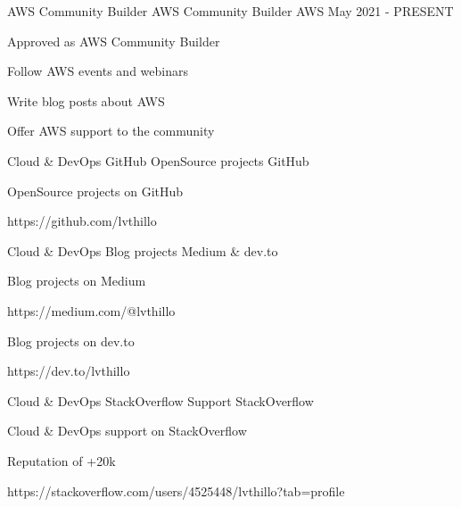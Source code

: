 

\begin{cventries}

  \cventry
    {AWS Community Builder} %
    {AWS Community Builder} %
    {AWS} %
    {May 2021 - PRESENT} %
    {
      \begin{cvitems} %
        \item {Approved as AWS Community Builder}
        \item {Follow AWS events and webinars}
        \item {Write blog posts about AWS}
        \item {Offer AWS support to the community}
      \end{cvitems}
    }

  \cventry
    {Cloud \& DevOps} %
    {GitHub OpenSource projects} %
    {GitHub} %
    {} %
    {
      \begin{cvitems} %
        \item {OpenSource projects on GitHub}
        \item {https://github.com/lvthillo}
      \end{cvitems}
    }

  \cventry
    {Cloud \& DevOps} %
    {Blog projects} %
    {Medium \& dev.to} %
    {} %
    {
      \begin{cvitems} %
        \item {Blog projects on Medium}
        \item {https://medium.com/@lvthillo}
        \item {Blog projects on dev.to}
        \item {https://dev.to/lvthillo}
      \end{cvitems}
    }

  \cventry
    {Cloud \& DevOps} %
    {StackOverflow Support} %
    {StackOverflow} %
    {} %
    {
      \begin{cvitems} %
        \item {Cloud \& DevOps support on StackOverflow}
        \item {Reputation of +20k}
        \item {https://stackoverflow.com/users/4525448/lvthillo?tab=profile}
      \end{cvitems}
    }


\end{cventries}
